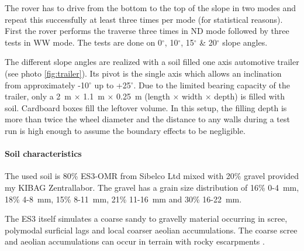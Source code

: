 \documentclass[a4paper,twocolumn]{esapub2005} %
\begin{document}
The rover has to drive from the bottom to the top
of the slope in two modes and repeat this successfully at least three times per mode (for statistical reasons).
First the rover performs the traverse three times in ND mode
followed by three tests in WW mode. The tests are done on
0$^{\circ}$, 10$^{\circ}$, 15$^{\circ}$ \& 20$^{\circ}$ slope angles. 

The different slope angles are realized with a soil filled one axis automotive trailer (see photo
\ref{fig:trailer}). Its pivot is the single axis which allows an inclination
from approximately -10$^{\circ}$ up to +25$^{\circ}$. Due to the limited
bearing capacity of the trailer, only a 2~\unit{m} $\times$ 1.1~\unit{m}
$\times$ 0.25~\unit{m} (length $\times$ width $\times$ depth) is filled with
soil. Cardboard boxes fill the leftover volume. In this setup, the filling
depth is more than twice the wheel diameter and the distance to any walls
during a test run is high enough to assume  the boundary effects to be
negligible.  

\paragraph{Soil characteristics} The used soil is 80\% ES3-OMR from Sibelco Ltd mixed with 20\%
gravel provided my KIBAG Zentrallabor. The gravel has a grain size distribution
of 16\% 0-4~\unit{mm}, 18\% 4-8~\unit{mm}, 15\% 8-11~\unit{mm}, 21\%
11-16~\unit{mm} and 30\% 16-22~\unit{mm}.  

The ES3 itself simulates a coarse sandy to gravelly material occurring in scree, polymodal surficial lags and local coarser aeolian accumulations. The coarse scree and aeolian accumulations can occur in terrain with rocky escarpments \cite{michaud2014}.



\end{document}
